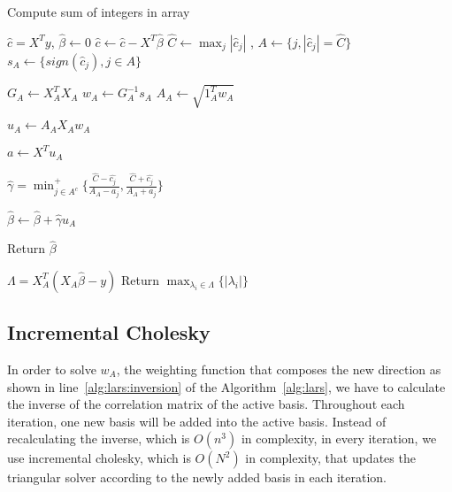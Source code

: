 \begin{algorithm}
	\caption{Compute sum of integers in array}
	\label{alg:lars}
	\begin{algorithmic}[1]
		    \State $\hat{c} = X^T y$, $\hat{\beta} \gets 0$ \label{alg:lars:initailize_correlation}
		      \State $\hat{c} \gets \hat{c} - X^T \hat{\beta}$ \label{alg:lars:get_active_idx}
		      \State $\hat{C} \gets \max_j{|\hat{c}_j|}$
		      , $A \gets \{j, |\hat{c}_j| = \hat{C} \}$
		      \State $s_A \gets \{sign(\hat{c}_j), j \in A\}$ \label{alg:lars:get_active_idx_end}
		      
		      \State $G_A \gets X_A^T X_A$ \label{alg:lars:cholesky}
		      \State $w_A \gets G_A^{-1} s_A$
		      \label{alg:lars:inversion}
		      \State $A_A \gets \sqrt{1_A^T w_A}$ \label{alg:lars:cholesky_end}
		      
		      \State $u_A \gets A_A X_A w_A$ \label{alg:lars:get_u}
		      
		      \State $a \gets X^T u_A$ \label{alg:lars:get_a}

		      \State $\hat{\gamma} = \min_{j \in A^c}^+ \Big\{ \frac{\hat{C} - \hat{c_j}}{A_A - a_j},  \frac{\hat{C} + \hat{c_j}}{A_A + a_j}\Big\}$ \label{alg:lars:get_gamma}
		      
		      \State $\hat{\beta} \gets \hat{\beta} + \hat{\gamma} u_A$ \label{alg:lars:update_beta}
		    
		    \EndWhile
            \State Return $\hat{\beta}$
		\EndProcedure
		
		\label{alg:lars:compute_lambda}
		    \State $\Lambda = X_A^T ( X_A \hat{\beta} - y)$
    		\State Return $\max_{\lambda_i \in \Lambda} \big\{ |\lambda_i| \big\}$ 
		\EndProcedure
	\end{algorithmic}
\end{algorithm}


\subsection{Incremental Cholesky}
\label{ssec:cholesky}
In order to solve $w_A$, the weighting function that composes the new direction as shown in line~\ref{alg:lars:inversion} of the Algorithm~\ref{alg:lars}, we have to calculate the inverse of the correlation matrix of the active basis. Throughout each iteration, one new basis will be added into the active basis. Instead of recalculating the inverse, which is $O(n^3)$ in complexity, in every iteration, we use incremental cholesky, which is $O(N^2)$ in complexity, that updates the triangular solver according to the newly added basis in each iteration.

